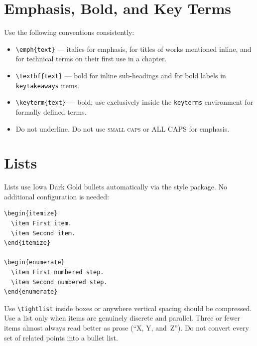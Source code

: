 \documentclass[11pt,openany]{book}
\newcommand{\code}[1]{\texttt{\small #1}}
\begin{document}
\section{Emphasis, Bold, and Key Terms}
\label{sec:emphasis}

Use the following conventions consistently:

\begin{itemize}
  \item \code{\textbackslash emph\{text\}} --- italics for emphasis, for titles of works mentioned inline, and for technical terms on their first use in a chapter.
  \item \code{\textbackslash textbf\{text\}} --- bold for inline sub-headings and for bold labels in \code{keytakeaways} items.
  \item \code{\textbackslash keyterm\{text\}} --- bold; use exclusively inside the \code{keyterms} environment for formally defined terms.
  \item Do not underline. Do not use \textsc{small caps} or ALL CAPS for emphasis.
\end{itemize}


\section{Lists}
\label{sec:lists}

Lists use Iowa Dark Gold bullets automatically via the style package. No additional configuration is needed:

\begin{lstlisting}
\begin{itemize}
  \item First item.
  \item Second item.
\end{itemize}

\begin{enumerate}
  \item First numbered step.
  \item Second numbered step.
\end{enumerate}
\end{lstlisting}

Use \code{\textbackslash tightlist} inside boxes or anywhere vertical spacing should be compressed. Use a list only when items are genuinely discrete and parallel. Three or fewer items almost always read better as prose (``X, Y, and~Z''). Do not convert every set of related points into a bullet list.
\end{document}
